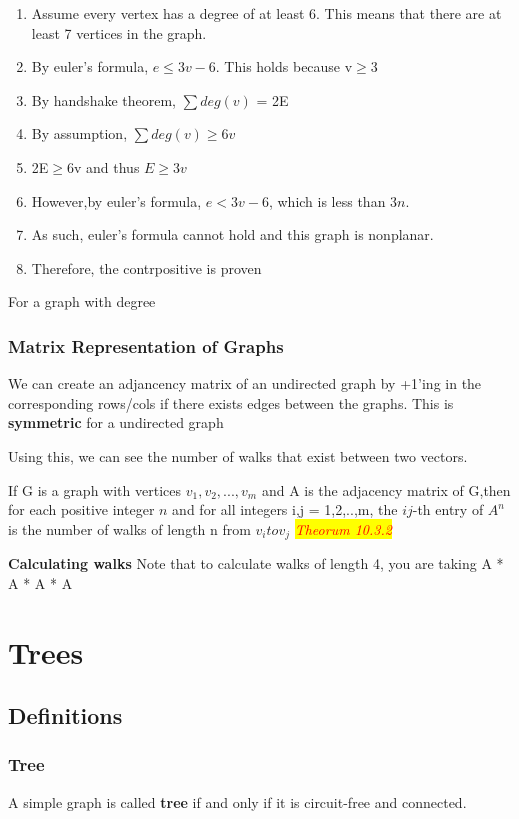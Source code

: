 \documentclass{article}
\newcommand{\theorum}[1]{\quad \quad \colorbox{yellow}{\textit{\textcolor{red}{Theorum #1}}}}
\newcommand{\sub}[1]{\vspace{10pt}\textbf{#1}}
\newcommand{\sbreak}{\vspace{10pt}}
\begin{document}
\sbreak
\begin{enumerate}
    \item Assume every vertex has a degree of at least 6. This means that there are at least 7 vertices in the graph.
    \item By euler's formula, $e \leq 3v - 6$. This holds because v$\geq$3
    \item By handshake theorem, $\sum deg(v)$ = 2E
    \item By assumption, $\sum deg(v) \geq 6v$
    \item 2E$\geq$6v and thus $E \geq 3v$
    \item However,by euler's formula, $e < 3v- 6$, which is less than $3n$.
    \item As such, euler's formula cannot hold and this graph is nonplanar.
    \item Therefore, the contrpositive is proven
\end{enumerate}

For a graph with degree

\subsubsection{Matrix Representation of Graphs}
We can create an adjancency matrix of an undirected graph by +1'ing in the corresponding rows/cols if there exists edges between the graphs. This is \textbf{symmetric} for a undirected graph

Using this, we can see the number of walks that exist between two vectors.

\sbreak

If G is a graph with vertices $v_1,v_2,...,v_m$ and A is the adjacency matrix of G,then for each positive integer $n$ and for all integers i,j = 1,2,..,m, the $ij$-th entry of $A^n$ is the number of walks of length n from $v_i to v_j$ \theorum{10.3.2}

\sub{Calculating walks}
Note that to calculate walks of length 4, you are taking A * A * A * A
\section{Trees}
\subsection{Definitions}
\subsubsection{Tree}
A simple graph is called \textbf{tree} if and only if it is circuit-free and connected.
\end{document}

